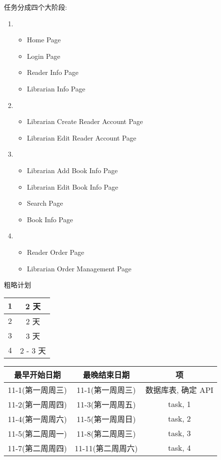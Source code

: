 \documentclass{ctexart}
\begin{document}
    任务分成四个大阶段:
    \begin{enumerate}
        \item %
            \begin{itemize}
                \item Home Page
                \item Login Page
                \item Reader Info Page
                \item Librarian Info Page
            \end{itemize}
        \item %
            \begin{itemize}
                \item Librarian Create Reader Account Page
                \item Librarian Edit Reader Account Page
            \end{itemize}
        \item %
            \begin{itemize}
                \item Librarian Add Book Info Page
                \item Librarian Edit Book Info Page
                \item Search Page
                \item Book Info Page
            \end{itemize}
        \item %
            \begin{itemize}
                \item Reader Order Page
                \item Librarian Order Management Page
            \end{itemize}
    \end{enumerate}

    粗略计划
    
    \begin{tabular}{|c|c|}
        \hline 
        1 & 2 天 \\ 
        \hline 
        2 & 2 天 \\ 
        \hline 
        3 & 3 天 \\ 
        \hline 
        4 & 2 - 3 天 \\ 
        \hline 
    \end{tabular} 

    \begin{tabular}{|c|c|c|}
        \hline 
        最早开始日期 & 最晚结束日期 & 项 \\
        \hline 
        11-1(第一周周三) & 11-1(第一周周三) & 数据库表, 确定 API \\ 
        \hline 
        11-2(第一周周四) & 11-3(第一周周五) & task, 1 \\ 
        \hline 
        11-4(第一周周六) & 11-5(第一周周日) & task, 2 \\ 
        \hline 
        11-5(第二周周一) & 11-8(第二周周三) & task, 3 \\ 
        \hline 
        11-7(第二周周四) & 11-11(第二周周六) & task, 4 \\ 
        \hline 
    \end{tabular} 
\end{document}
